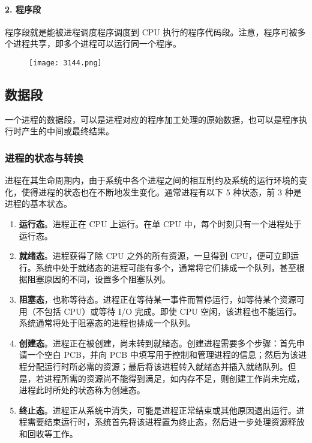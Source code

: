 \documentclass{ctexbook}
\begin{document}
	\paragraph{2. 程序段}
	
	程序段就是能被进程调度程序调度到 CPU 执行的程序代码段。注意，程序可被多个进程共享，即多个进程可以运行同一个程序。
	
	
	\begin{figure}[h]
		\centering
		\centering
		\label{fig:ttttt}
		\texttt{[image: 3144.png]}
		\caption{}
	\end{figure}
	
	\subsection{数据段}
	
	一个进程的数据段，可以是进程对应的程序加工处理的原始数据，也可以是程序执行时产生的中间或最终结果。
	
	\subsubsection{进程的状态与转换}
	
	进程在其生命周期内，由于系统中各个进程之间的相互制约及系统的运行环境的变化，使得进程的状态也在不断地发生变化。通常进程有以下 5 种状态，前 3 种是进程的基本状态。
	
	\begin{enumerate}
		\item \textbf{运行态}。进程正在 CPU 上运行。在单 CPU 中，每个时刻只有一个进程处于运行态。
		\item \textbf{就绪态}。进程获得了除 CPU 之外的所有资源，一旦得到 CPU，便可立即运行。系统中处于就绪态的进程可能有多个，通常将它们排成一个队列，甚至根据阻塞原因的不同，设置多个阻塞队列。
		\item \textbf{阻塞态}，也称等待态。进程正在等待某一事件而暂停运行，如等待某个资源可用（不包括 CPU）或等待 I/O 完成。即使 CPU 空闲，该进程也不能运行。系统通常将处于阻塞态的进程也排成一个队列。
		\item \textbf{创建态}。进程正在被创建，尚未转到就绪态。创建进程需要多个步骤：首先申请一个空白 PCB，并向 PCB 中填写用于控制和管理进程的信息；然后为该进程分配运行时所必需的资源；最后将该进程转入就绪态并插入就绪队列。但是，若进程所需的资源尚不能得到满足，如内存不足，则创建工作尚未完成，进程此时所处的状态称为创建态。
		\item \textbf{终止态}。进程正从系统中消失，可能是进程正常结束或其他原因退出运行。进程需要结束运行时，系统首先将该进程置为终止态，然后进一步处理资源释放和回收等工作。
	\end{enumerate}
	
\end{document}
